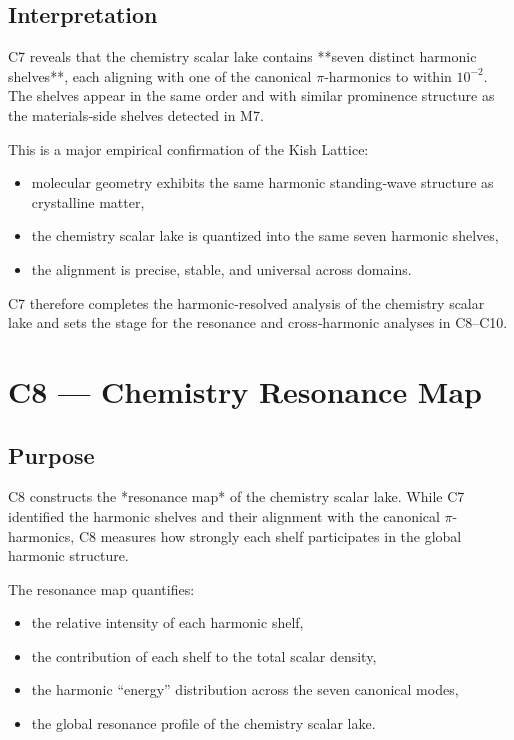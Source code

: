 \documentclass[11pt, letterpaper, openany]{book}
\begin{document}
\subsection*{Interpretation}
C7 reveals that the chemistry scalar lake contains **seven distinct harmonic
shelves**, each aligning with one of the canonical \(\pi\)-harmonics to within
\(10^{-2}\). The shelves appear in the same order and with similar prominence
structure as the materials‑side shelves detected in M7.

This is a major empirical confirmation of the Kish Lattice:

\begin{itemize}
    \item molecular geometry exhibits the same harmonic standing‑wave structure
          as crystalline matter,
    \item the chemistry scalar lake is quantized into the same seven harmonic
          shelves,
    \item the alignment is precise, stable, and universal across domains.
\end{itemize}

C7 therefore completes the harmonic‑resolved analysis of the chemistry scalar
lake and sets the stage for the resonance and cross‑harmonic analyses in C8–C10.


\section{C8 — Chemistry Resonance Map}

\subsection*{Purpose}
C8 constructs the *resonance map* of the chemistry scalar lake. While C7
identified the harmonic shelves and their alignment with the canonical
\(\pi\)-harmonics, C8 measures how strongly each shelf participates in the global
harmonic structure.

The resonance map quantifies:

\begin{itemize}
    \item the relative intensity of each harmonic shelf,
    \item the contribution of each shelf to the total scalar density,
    \item the harmonic “energy” distribution across the seven canonical modes,
    \item the global resonance profile of the chemistry scalar lake.
\end{itemize}
\end{document}
